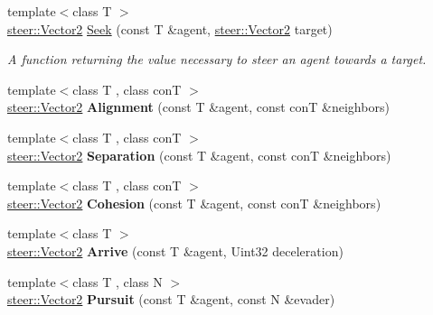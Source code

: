 \begin{DoxyCompactItemize}
\item 
{\footnotesize template$<$class T $>$ }\\\hyperlink{structsteer_1_1_vector2}{steer\-::\-Vector2} \hyperlink{namespacesteer_a92f488edeb6cd89274a14366eb3a7e1c}{Seek} (const T \&agent, \hyperlink{structsteer_1_1_vector2}{steer\-::\-Vector2} target)
\begin{DoxyCompactList}\small\item\em A function returning the value necessary to steer an agent towards a target. \end{DoxyCompactList}\item 
\hypertarget{namespacesteer_a64bb9c71a340f94f6f6ddb83c4687794}{{\footnotesize template$<$class T , class con\-T $>$ }\\\hyperlink{structsteer_1_1_vector2}{steer\-::\-Vector2} {\bfseries Alignment} (const T \&agent, const con\-T \&neighbors)}\label{namespacesteer_a64bb9c71a340f94f6f6ddb83c4687794}

\item 
\hypertarget{namespacesteer_ac649e70536c11824179384d0f3691229}{{\footnotesize template$<$class T , class con\-T $>$ }\\\hyperlink{structsteer_1_1_vector2}{steer\-::\-Vector2} {\bfseries Separation} (const T \&agent, const con\-T \&neighbors)}\label{namespacesteer_ac649e70536c11824179384d0f3691229}

\item 
\hypertarget{namespacesteer_a1fd211d8f4c74ca65137f16f5131eca0}{{\footnotesize template$<$class T , class con\-T $>$ }\\\hyperlink{structsteer_1_1_vector2}{steer\-::\-Vector2} {\bfseries Cohesion} (const T \&agent, const con\-T \&neighbors)}\label{namespacesteer_a1fd211d8f4c74ca65137f16f5131eca0}

\item 
\hypertarget{namespacesteer_ab557c11c5fba2631820b9f184fc20591}{{\footnotesize template$<$class T $>$ }\\\hyperlink{structsteer_1_1_vector2}{steer\-::\-Vector2} {\bfseries Arrive} (const T \&agent, Uint32 deceleration)}\label{namespacesteer_ab557c11c5fba2631820b9f184fc20591}

\item 
\hypertarget{namespacesteer_a02cc978d5bf37be9d1e57014414a904e}{{\footnotesize template$<$class T , class N $>$ }\\\hyperlink{structsteer_1_1_vector2}{steer\-::\-Vector2} {\bfseries Pursuit} (const T \&agent, const N \&evader)}\label{namespacesteer_a02cc978d5bf37be9d1e57014414a904e}


\end{DoxyCompactItemize}
